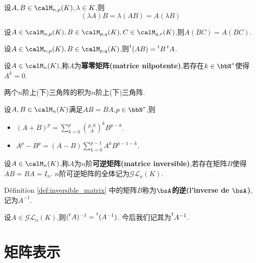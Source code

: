 \begin{rqq}
    设$A, B \in \calM_{n, p}(K), \lambda \in K$,则
    \[ (\lambda A)B = \lambda(AB) = A(\lambda B) \]
\end{rqq}

\begin{prop}
    设$A \in \calM_{n, p}(K), B \in \calM_{p, q}(K), C \in \calM_{q, r}(K)$,则$A(BC) = A(BC)$.
\end{prop}

\begin{prop}
    设$A \in \calM_{n, p}(K), B \in \calM_{p, q}(K)$,则$\prescript{t}{}{(AB)} = \prescript{t}{}{B} \prescript{t}{}{A}$.
\end{prop}

\begin{deff}
    设$A \in \calM_n(K)$,称$A$为\textbf{幂零矩阵(matrice nilpotente)},若存在$k \in \bbN^*$使得$A^k = 0$.
\end{deff}

\begin{prop}
    两个$n$阶上(下)三角阵的积为$n$阶上(下)三角阵.
\end{prop}

\begin{prop}
    设$A, B \in \calM_n(K)$满足$AB = BA$,$p \in \bbN^*$,则
    \begin{itemize}
        \item $(A + B)^p = \sum\limits_{k = 0}^p \binom{p, k} A^kB^{p - k}$.
        \item $A^p - B^p = (A - B)\sum\limits_{k = 0}^{p - 1} A^kB^{p - 1 - k}$.
    \end{itemize}
\end{prop}

\begin{deff} \label{def:inversible_matrix}
    设$A \in \calM_{n}(K)$,称$A$为$n$阶\textbf{可逆矩阵(matrice inversible)},若存在矩阵$B$使得$AB = BA = I_n$.
    $n$阶可逆矩阵的全体记为$\mathcal{GL}_n(K)$.
\end{deff}

\begin{rqq}
    Définition \ref{def:inversible_matrix} 中的矩阵$B$称为\textbf{$\bsA$的逆(l'inverse de $\bsA$)},记为$A^{-1}$.
\end{rqq}

\begin{prop}
    设$A \in \mathcal{GL}_n(K)$,则$(\prescript{t}{}{A})^{-1} = \prescript{t}{}{(A^{-1})}$.
    今后我们记其为$\prescript{t}{}{A^{-1}}$.
\end{prop}

\section{矩阵表示}

